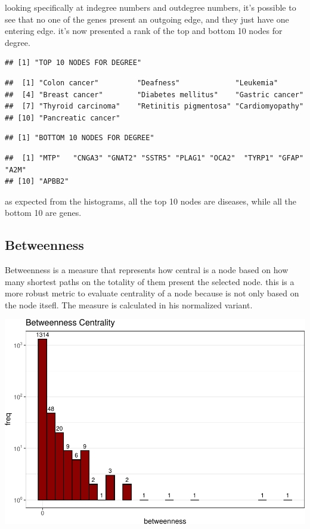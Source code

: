 \documentclass[
]{article}
\begin{document}
looking specifically at indegree numbers and outdegree numbers, it's possible to see that no one of the genes present an outgoing edge, and they just have one entering edge. it's now presented a rank of the top and bottom 10 nodes for degree.

\begin{verbatim}
## [1] "TOP 10 NODES FOR DEGREE"
\end{verbatim}

\begin{verbatim}
##  [1] "Colon cancer"         "Deafness"             "Leukemia"            
##  [4] "Breast cancer"        "Diabetes mellitus"    "Gastric cancer"      
##  [7] "Thyroid carcinoma"    "Retinitis pigmentosa" "Cardiomyopathy"      
## [10] "Pancreatic cancer"
\end{verbatim}

\begin{verbatim}
## [1] "BOTTOM 10 NODES FOR DEGREE"
\end{verbatim}

\begin{verbatim}
##  [1] "MTP"   "CNGA3" "GNAT2" "SSTR5" "PLAG1" "OCA2"  "TYRP1" "GFAP"  "A2M"  
## [10] "APBB2"
\end{verbatim}

as expected from the histograms, all the top 10 nodes are diseases, while all the bottom 10 are genes.

\hypertarget{betweenness}{%
\subsection{Betweenness}\label{betweenness}}

Betweenness is a measure that represents how central is a node based on how many shortest paths on the totality of them present the selected node. this is a more robust metric to evaluate centrality of a node because is not only based on the node itsefl. The measure is calculated in his normalized variant.

\includegraphics{HumanDiseaseNetwork_files/figure-latex/unnamed-chunk-7-1.pdf}
\end{document}
